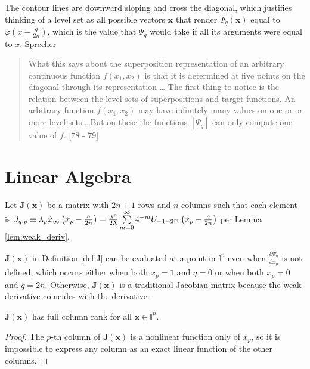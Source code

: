 The contour lines are downward sloping and cross the diagonal, which justifies thinking of a level set as all possible vectors $\mathbf{x}$ that render $\Psi_q\left(\mathbf{x}\right)$ equal to $\varphi\left(x - \frac{q}{2n}\right)$, which is the value that $\Psi_q$ would take if all its arguments were equal to $x$. Sprecher
\begin{quote}
What this says about the superposition representation of an arbitrary continuous function $f\left(x_1, x_2\right)$ is that it is determined at five points on the diagonal through its representation \dots
The first thing to notice is the relation between the level sets of superpositions and target functions. An arbitrary function $f\left(x_1, x_2\right)$ may have infinitely many values on one or or more level sets \dots But on these the functions $\left[\Psi_q\right]$ can only compute one value of $f$. [78 - 79]
\end{quote}

\section{Linear Algebra}\label{sec:LinearAlgebra}

\begin{definition}
  \label{def:J}
  Let $\mathbf{J}\left(\mathbf{x}\right)$ be a matrix with $2n + 1$ rows and $n$ columns such that each element is $J_{q,p} \equiv \lambda_p \dotvarphi[x_p - \frac{q}{2n}]{\infty} = \frac{\lambda^p}{2\Lambda} \sum\limits_{m = 0}^\infty 4^{-m} U_{-1 + 2^m}\left(x_p - \frac{q}{2n}\right)$ per Lemma \ref{lem:weak_deriv}.
\end{definition}
\begin{remark*}
  $\mathbf{J}\left(\mathbf{x}\right)$ in Definition \ref{def:J} can be evaluated at a point in $\mathbb{I}^n$ even when $\frac{\partial \Psi_q}{\partial x_p}$ is not defined, which occurs either when both $x_p = 1$ and $q = 0$ or when both $x_p = 0$ and $q = 2n$. Otherwise, $\mathbf{J}\left(\mathbf{x}\right)$ is a traditional Jacobian matrix because the weak derivative coincides with the derivative.
\end{remark*}

\begin{lemma}
  \label{lem:full_rank}
  $\mathbf{J}\left(\mathbf{x}\right)$ has full column rank for all $\mathbf{x} \in \mathbb{I}^n$.
\end{lemma}
\begin{proof}
  The $p$-th column of $\mathbf{J}\left(\mathbf{x}\right)$ is a nonlinear function only of $x_p$, so it is impossible to express any column as an exact linear function of the other columns.
\end{proof}

